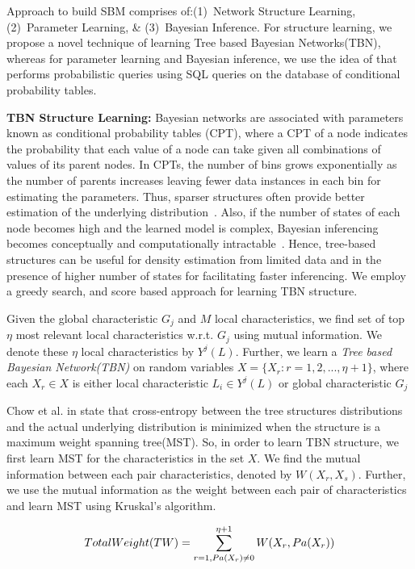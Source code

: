 Approach to build SBM comprises of:(1)~Network Structure Learning, (2)~Parameter Learning, \& (3)~Bayesian Inference. For structure learning, we propose a novel technique of learning Tree based Bayesian Networks(TBN), whereas for parameter learning and Bayesian inference, we use the idea of \cite{yadav2015business} that performs probabilistic queries using SQL queries on the database of conditional probability tables.

\textbf{TBN Structure Learning:}\label{sec:struct}
Bayesian networks are associated with parameters known as conditional probability tables (CPT), where a CPT of a node indicates the probability that each value of a node can take given all combinations of values of its parent nodes. In CPTs, the number of bins grows exponentially as the number of parents increases leaving fewer data instances in each bin for estimating the parameters. Thus, sparser structures often provide better estimation of the underlying distribution~\cite{koller2009probabilistic}. Also, if the number of states of each node becomes high and the learned model is complex, Bayesian inferencing becomes conceptually and computationally intractable~\cite{lam1994learning}.
Hence, tree-based structures can be useful for density estimation from limited data and in the presence of higher number of states for facilitating faster inferencing. We employ a greedy search, and score based approach for learning TBN structure.

Given the global characteristic $G_j$ and $M$ local characteristics, we find set of top $\eta$ most relevant local characteristics w.r.t. $G_j$ using mutual information. We denote these $\eta$ local characteristics by $Y^j(L)$. Further, we learn a \textit{Tree based Bayesian Network(TBN)} on random variables $X = \{X_r: r=1,2,...,\eta+1\}$, where each $X_r \in X$ is either local characteristic $L_i \in Y^j(L)$ or global characteristic $G_j$ 

Chow et al. in \cite{chow1968approximating} state that cross-entropy between the tree structures distributions and the actual underlying distribution is minimized when the structure is a maximum weight spanning tree(MST). So, in order to learn TBN structure, we first learn MST for the characteristics in the set $X$. We find the mutual information between each pair characteristics, denoted by $W(X_r,X_s)$. Further, we use the mutual information as the weight between each pair of characteristics and learn MST using Kruskal's algorithm.

\vspace{-15pt}
\begin{equation}
\scriptsize
\label{eq:cross_ent}
Total Weight(TW) = \sum_{r=1,Pa(X_{r}) \neq 0}^{\eta+1} W(X_{r},Pa(X_{r}))
\vspace{-5pt}
\end{equation}

